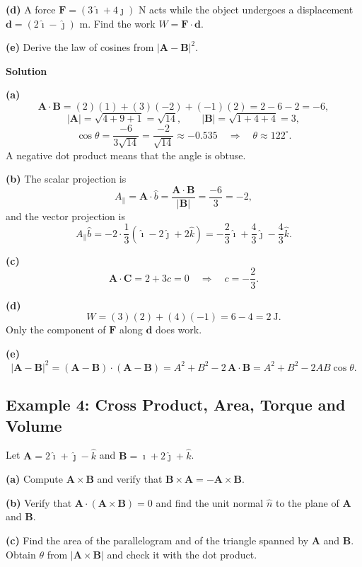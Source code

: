 \documentclass[../main.tex]{subfiles}
\begin{document}
\textbf{(d)} A force $\mathbf{F} = (3\hat{\imath}+4\hat{\jmath})$ N acts while the object undergoes a displacement $\mathbf{d} = (2\hat{\imath}-\hat{\jmath})$ m. Find the work $W = \mathbf{F}\cdot\mathbf{d}$.

\textbf{(e)} Derive the law of cosines from $|\mathbf{A}-\mathbf{B}|^2$.

\bigskip
\textbf{Solution}

\textbf{(a)}
\[
\mathbf{A}\cdot\mathbf{B} = (2)(1)+(3)(-2)+(-1)(2) = 2-6-2 = -6,
\]
\[
|\mathbf{A}| = \sqrt{4+9+1} = \sqrt{14},
\qquad
|\mathbf{B}| = \sqrt{1+4+4} = 3,
\]
\[
\cos\theta = \frac{-6}{3\sqrt{14}} = \frac{-2}{\sqrt{14}} \approx -0.535
\quad \Longrightarrow \quad \theta \approx 122^\circ .
\]
A negative dot product means that the angle is obtuse.

\textbf{(b)} The scalar projection is
\[
A_{\parallel} = \mathbf{A}\cdot\hat{b} = \frac{\mathbf{A}\cdot\mathbf{B}}{|\mathbf{B}|} = \frac{-6}{3} = -2,
\]
and the vector projection is
\[
A_{\parallel}\hat{b} = -2\cdot\frac{1}{3}\left(\hat{\imath}-2\hat{\jmath}+2\hat{k}\right)
= -\frac{2}{3}\hat{\imath}+\frac{4}{3}\hat{\jmath}-\frac{4}{3}\hat{k}.
\]

\textbf{(c)}
\[
\mathbf{A}\cdot\mathbf{C} = 2 + 3c = 0
\quad \Longrightarrow \quad c = -\frac{2}{3}.
\]

\textbf{(d)}
\[
W = (3)(2)+(4)(-1) = 6-4 = 2\ \text{J}.
\]
Only the component of $\mathbf{F}$ along $\mathbf{d}$ does work.

\textbf{(e)}
\[
|\mathbf{A}-\mathbf{B}|^2 = (\mathbf{A}-\mathbf{B})\cdot(\mathbf{A}-\mathbf{B})
= A^2 + B^2 - 2\,\mathbf{A}\cdot\mathbf{B}
= A^2 + B^2 - 2AB\cos\theta .
\]


\subsection{Example 4: Cross Product, Area, Torque and Volume}

Let $\mathbf{A} = 2\hat{\imath}+\hat{\jmath}-\hat{k}$ and $\mathbf{B} = \hat{\imath}+2\hat{\jmath}+\hat{k}$.

\textbf{(a)} Compute $\mathbf{A}\times\mathbf{B}$ and verify that $\mathbf{B}\times\mathbf{A} = -\mathbf{A}\times\mathbf{B}$.

\textbf{(b)} Verify that $\mathbf{A}\cdot(\mathbf{A}\times\mathbf{B}) = 0$ and find the unit normal $\hat{n}$ to the plane of $\mathbf{A}$ and $\mathbf{B}$.

\textbf{(c)} Find the area of the parallelogram and of the triangle spanned by $\mathbf{A}$ and $\mathbf{B}$. Obtain $\theta$ from $|\mathbf{A}\times\mathbf{B}|$ and check it with the dot product.
\end{document}
